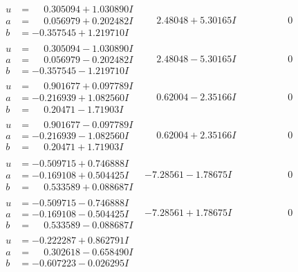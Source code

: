 \documentclass[1p]{elsarticle_modified}
\theoremstyle{definition}
\begin{document}
$$\begin{array}{c|c|c}
\begin{aligned}
u &= \phantom{-}0.305094 + 1.030890 I \\
a &= \phantom{-}0.056979 + 0.202482 I \\
b &= -0.357545 + 1.219710 I\end{aligned}
 & \phantom{-}2.48048 + 5.30165 I & \phantom{-0.000000 } 0 \\ \hline\begin{aligned}
u &= \phantom{-}0.305094 - 1.030890 I \\
a &= \phantom{-}0.056979 - 0.202482 I \\
b &= -0.357545 - 1.219710 I\end{aligned}
 & \phantom{-}2.48048 - 5.30165 I & \phantom{-0.000000 } 0 \\ \hline\begin{aligned}
u &= \phantom{-}0.901677 + 0.097789 I \\
a &= -0.216939 + 1.082560 I \\
b &= \phantom{-}0.20471 - 1.71903 I\end{aligned}
 & \phantom{-}0.62004 - 2.35166 I & \phantom{-0.000000 } 0 \\ \hline\begin{aligned}
u &= \phantom{-}0.901677 - 0.097789 I \\
a &= -0.216939 - 1.082560 I \\
b &= \phantom{-}0.20471 + 1.71903 I\end{aligned}
 & \phantom{-}0.62004 + 2.35166 I & \phantom{-0.000000 } 0 \\ \hline\begin{aligned}
u &= -0.509715 + 0.746888 I \\
a &= -0.169108 + 0.504425 I \\
b &= \phantom{-}0.533589 + 0.088687 I\end{aligned}
 & -7.28561 - 1.78675 I & \phantom{-0.000000 } 0 \\ \hline\begin{aligned}
u &= -0.509715 - 0.746888 I \\
a &= -0.169108 - 0.504425 I \\
b &= \phantom{-}0.533589 - 0.088687 I\end{aligned}
 & -7.28561 + 1.78675 I & \phantom{-0.000000 } 0 \\ \hline\begin{aligned}
u &= -0.222287 + 0.862791 I \\
a &= \phantom{-}0.302618 - 0.658490 I \\
b &= -0.607223 - 0.026295 I\end{aligned}

\end{array}$$
\end{document}
